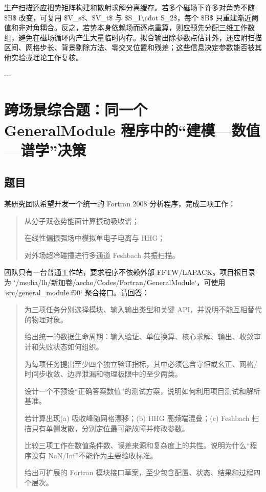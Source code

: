 \documentclass[UTF8,openany,11pt,fontset=fandol]{ctexbook}
\begin{document}
生产扫描还应把势矩阵构建和散射求解分离缓存。若多个磁场下许多对角势不随
\$B\$ 改变，可复用 \$V\_s\$、\$V\_t\$ 与 \$S\_1\textbackslash cdot
S\_2\$，每个 \$B\$
只重建渐近阈值和非对角耦合。反之，若势本身依赖场而逐点重算，则应预先分配三维工作数组，避免在磁场循环内产生大量临时内存。拟合输出除参数点估计外，还应附扫描区间、网格步长、背景剔除方法、零交叉位置和残差；这些信息决定参数能否被其他实验或理论工作复核。

-\/-\/-

\section{\texorpdfstring{\textbf{跨场景综合题：同一个 GeneralModule
程序中的``建模---数值---谱学''决策}}{跨场景综合题：同一个 GeneralModule 程序中的``建模---数值---谱学''决策}}\label{ux8de8ux573aux666fux7efcux5408ux9898ux540cux4e00ux4e2a-generalmodule-ux7a0bux5e8fux4e2dux7684ux5efaux6a21ux6570ux503cux8c31ux5b66ux51b3ux7b56}

\subsection{\texorpdfstring{\textbf{题目}}{题目}}\label{ux9898ux76ee}

某研究团队希望开发一个统一的 Fortran 2008 分析程序，完成三项工作：

\begin{quote}
从分子双态势能面计算振动吸收谱；

在线性偏振强场中模拟单电子电离与 HHG；

对外场超冷碰撞进行多通道 Feshbach 共振扫描。
\end{quote}

团队只有一台普通工作站，要求程序不依赖外部 FFTW/LAPACK。项目根目录为
`/media/lh/新加卷/aecho/Codes/Fortran/GeneralModule`，可使用
`src/general\_module.f90` 聚合接口。请回答：

\begin{quote}
为三项任务分别选择模块、输入输出类型和关键
API，并说明不能互相替代的物理对象。

给出统一的数据生命周期：输入验证、单位换算、核心求解、输出、收敛审计和失败状态如何组织。

为每项任务提出至少四个独立验证指标，其中必须包含守恒或幺正、网格/时间步收敛、边界泄漏和物理极限中的至少两类。

设计一个不预设``正确答案数值''的测试方案，说明如何利用项目测试和解析基准。

若计算出现(a) 吸收峰随网格漂移；(b) HHG 高频端混叠；(c) Feshbach
扫描只有单侧发散，分别定位最可能故障并修改参数。

比较三项工作在数值条件数、误差来源和复杂度上的共性。说明为什么``程序没有
NaN/Inf''不能作为主要验收标准。

给出可扩展的 Fortran
模块接口草案，至少包含配置、状态、结果和过程四个层次。
\end{quote}
\end{document}
